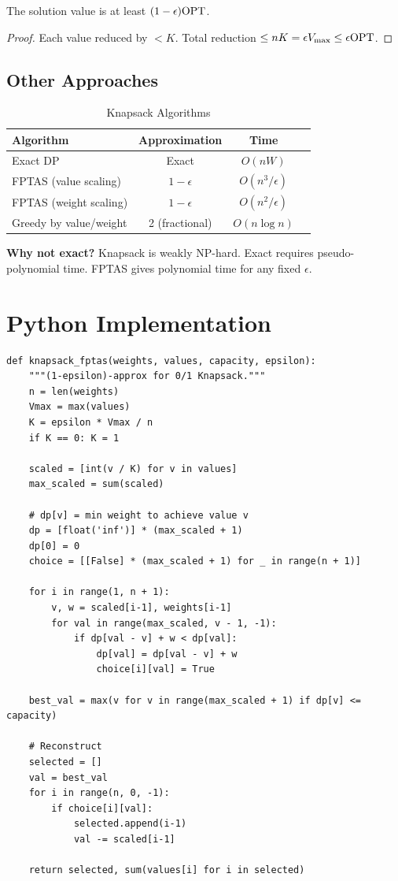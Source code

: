 \begin{theorem}
The solution value is at least $(1-\epsilon)\mathrm{OPT}$.
\end{theorem}
\begin{proof}
Each value reduced by $< K$. Total reduction $\leq nK = \epsilon V_{\max} \leq \epsilon \mathrm{OPT}$.
\end{proof}

\subsection{Other Approaches}

\begin{table}[H]
\centering
\caption{Knapsack Algorithms}
\begin{tabular}{lccc}
\toprule
Algorithm & Approximation & Time \\
\midrule
Exact DP & Exact & $O(nW)$ \\
FPTAS (value scaling) & $1-\epsilon$ & $O(n^3/\epsilon)$ \\
FPTAS (weight scaling) & $1-\epsilon$ & $O(n^2/\epsilon)$ \\
Greedy by value/weight & 2 (fractional) & $O(n \log n)$ \\
\bottomrule
\end{tabular}
\end{table}

\textbf{Why not exact?} Knapsack is weakly NP-hard. Exact requires pseudo-polynomial time. FPTAS gives polynomial time for any fixed $\epsilon$.

\section{Python Implementation}

\begin{lstlisting}[style=python, caption=Knapsack FPTAS]
def knapsack_fptas(weights, values, capacity, epsilon):
    """(1-epsilon)-approx for 0/1 Knapsack."""
    n = len(weights)
    Vmax = max(values)
    K = epsilon * Vmax / n
    if K == 0: K = 1
    
    scaled = [int(v / K) for v in values]
    max_scaled = sum(scaled)
    
    # dp[v] = min weight to achieve value v
    dp = [float('inf')] * (max_scaled + 1)
    dp[0] = 0
    choice = [[False] * (max_scaled + 1) for _ in range(n + 1)]
    
    for i in range(1, n + 1):
        v, w = scaled[i-1], weights[i-1]
        for val in range(max_scaled, v - 1, -1):
            if dp[val - v] + w < dp[val]:
                dp[val] = dp[val - v] + w
                choice[i][val] = True
    
    best_val = max(v for v in range(max_scaled + 1) if dp[v] <= capacity)
    
    # Reconstruct
    selected = []
    val = best_val
    for i in range(n, 0, -1):
        if choice[i][val]:
            selected.append(i-1)
            val -= scaled[i-1]
    
    return selected, sum(values[i] for i in selected)
\end{lstlisting}

